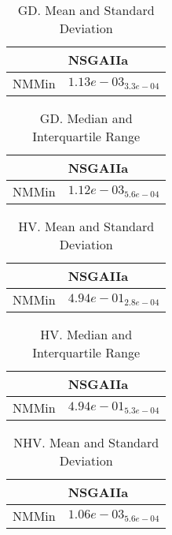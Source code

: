 \documentclass{article}
\begin{document}
\begin{table}
\caption{GD. Mean and Standard Deviation}
\label{table: GD}
\centering
\begin{scriptsize}
\begin{tabular}{ll}
\hline &  NSGAIIa\\
\hline 
NMMin & \cellcolor{gray95}$  1.13e-03_{ 3.3e-04}$ \\
\hline
\end{tabular}
\end{scriptsize}
\end{table}

\begin{table}
\caption{GD. Median and Interquartile Range}
\label{table: GD}
\centering
\begin{scriptsize}
\begin{tabular}{ll}
\hline &  NSGAIIa\\
\hline 
NMMin & \cellcolor{gray95}$  1.12e-03_{ 5.6e-04}$ \\
\hline
\end{tabular}
\end{scriptsize}
\end{table}

\begin{table}
\caption{HV. Mean and Standard Deviation}
\label{table: HV}
\centering
\begin{scriptsize}
\begin{tabular}{ll}
\hline &  NSGAIIa\\
\hline 
NMMin & \cellcolor{gray95}$  4.94e-01_{ 2.8e-04}$ \\
\hline
\end{tabular}
\end{scriptsize}
\end{table}

\begin{table}
\caption{HV. Median and Interquartile Range}
\label{table: HV}
\centering
\begin{scriptsize}
\begin{tabular}{ll}
\hline &  NSGAIIa\\
\hline 
NMMin & \cellcolor{gray95}$  4.94e-01_{ 5.3e-04}$ \\
\hline
\end{tabular}
\end{scriptsize}
\end{table}

\begin{table}
\caption{NHV. Mean and Standard Deviation}
\label{table: NHV}
\centering
\begin{scriptsize}
\begin{tabular}{ll}
\hline &  NSGAIIa\\
\hline 
NMMin & \cellcolor{gray95}$  1.06e-03_{ 5.6e-04}$ \\
\hline
\end{tabular}
\end{scriptsize}
\end{table}
\end{document}
